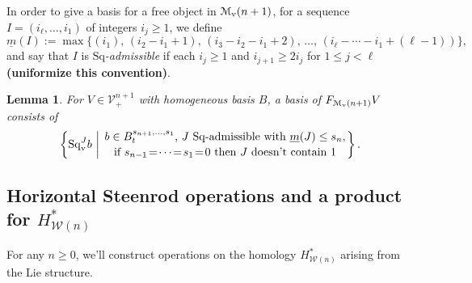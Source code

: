 \documentclass[11pt]{amsart}
\theoremstyle{plain}
\newtheorem{lem}[thm]{Lemma}
\theoremstyle{definition}
\newcommand{\calW}{\mathcal{W}}
\newcommand{\calV}{\mathcal{V}}
\newcommand{\calMv}{\mathcal{M}_\textup{v}}
\theoremstyle{plain}
\newcommand{\vect}[2]{\calV^{#1}_{#2}}
\newcommand{\minDimSq}{\underline{m}}
\newcommand{\Sq}{\mathrm{Sq}}
\begin{document}
\begin{Cohomology Operations for W and U}
In order to give a basis for a free object in $\calMv(n+1)$, for a sequence $I=(i_\ell,\ldots,i_1)$ of integers $i_j\geq1$, we define
\[\minDimSq(I):=\max\{(i_1),\,(i_2-i_1+1),\,(i_3-i_2-i_1+2),\,\ldots,\,(i_{\ell}-\cdots-i_1+(\ell-1))\},
\]
and say that $I$ is \emph{$\Sq$-admissible} if each $i_j\geq1$ and $i_{j+1}\geq 2i_j$ for $1\leq j <\ell$ \textbf{(uniformize this convention)}.
\begin{lem}
For $V\in\vect{n+1}{+}$ with homogeneous basis $B$, a basis of $F_{\calMv(n+1)}V$ consists of
\[\left\{\Sq^J_{\textup{v}}b\ \middle|\ \genfrac{}{}{0pt}{}{b\in B^{s_{n+1},\ldots,s_1}_t\textup{, $J$ $\Sq$-admissible with }\minDimSq(J)\leq s_n,}{\textup{if }s_{n-1}\!=\!\cdots\!=\!s_1\!=\!0\textup{ then $J$ doesn't contain 1}}\right\}.\]


\end{lem}

\subsection{Horizontal Steenrod operations and a product for $H^*_{\calW(n)}$}
For any $n\geq 0$, we'll construct operations on the homology $H^*_{\calW(n)}$ arising from the Lie structure.


\end{Cohomology Operations for W and U}
\end{document}

